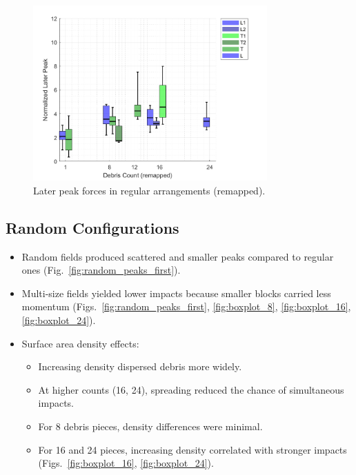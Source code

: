 \documentclass{article}
\begin{document}
\begin{figure}[htbp]
    \centering
    \includegraphics[width=0.8\textwidth]{LaterPeak_Regular_RemappedT.png}
    \caption{Later peak forces in regular arrangements (remapped).}
    \label{fig:laterpeak_regular_remap}
\end{figure}

\subsection{Random Configurations}
\begin{itemize}
    \item Random fields produced scattered and smaller peaks compared to regular ones (Fig.~\ref{fig:random_peaks_first}). 
    \item Multi-size fields yielded lower impacts because smaller blocks carried less momentum (Figs.~\ref{fig:random_peaks_first}, \ref{fig:boxplot_8}, \ref{fig:boxplot_16}, \ref{fig:boxplot_24}).
    \item Surface area density effects:
    \begin{itemize}
        \item Increasing density dispersed debris more widely.
        \item At higher counts (16, 24), spreading reduced the chance of simultaneous impacts.
        \item For 8 debris pieces, density differences were minimal.
        \item For 16 and 24 pieces, increasing density correlated with stronger impacts (Figs.~\ref{fig:boxplot_16}, \ref{fig:boxplot_24}).
    \end{itemize}
\end{itemize}
   
\end{document}
